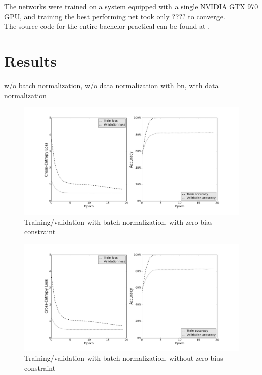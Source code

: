 \documentclass[a4paper, 11pt]{article}
\begin{document}
The networks were trained on a system equipped with a single NVIDIA GTX 970 GPU, and training the best performing net took only ???? to converge.\\

The source code for the entire bachelor practical can be found at \cite{UnternaehrerCode}.

\section{Results}
w/o batch normalization, w/o data normalization
with bn, with data normalization

\begin{figure}[!h]
	\includegraphics[width=\linewidth]{bn_bias-constraint.png}
	\caption{Training/validation with batch normalization, with zero bias constraint}
	\label{fig:bn_bias}
\end{figure}

\begin{figure}
	\includegraphics[width=\linewidth]{bn_no-bias-constraint.png}
	\caption{Training/validation with batch normalization, without zero bias constraint}
	\label{fig:bn_no-bias}
\end{figure}
\end{document}
